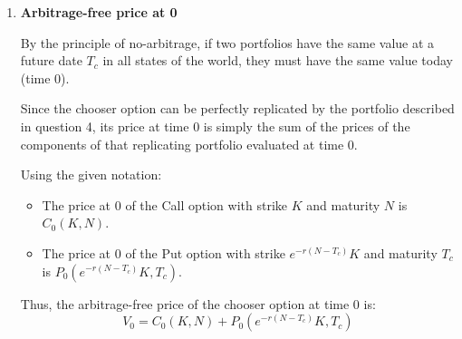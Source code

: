 \begin{enumerate}
            Therefore, to replicate the payoff of the chooser option at $T_c$, an investor can buy a portfolio at time 0 consisting of:
            \begin{itemize}
                  \item One European Call option with strike $K$ and maturity $N$.
                  \item One European Put option with strike $e^{-r(N-T_c)} K$ and maturity $T_c$.
            \end{itemize}

      \item \textbf{Arbitrage-free price at 0}

            By the principle of no-arbitrage, if two portfolios have the same value at a future date $T_c$ in all states of the world, they must have the same value today (time 0).

            Since the chooser option can be perfectly replicated by the portfolio described in question 4, its price at time 0 is simply the sum of the prices of the components of that replicating portfolio evaluated at time 0.

            Using the given notation:
            \begin{itemize}
                  \item The price at 0 of the Call option with strike $K$ and maturity $N$ is $C_0(K, N)$.
                  \item The price at 0 of the Put option with strike $e^{-r(N-T_c)} K$ and maturity $T_c$ is $P_0(e^{-r(N-T_c)} K, T_c)$.
            \end{itemize}

            Thus, the arbitrage-free price of the chooser option at time 0 is:
            \[ V_0 = C_0(K, N) + P_0\left(e^{-r(N-T_c)} K, T_c\right) \]

\end{enumerate}